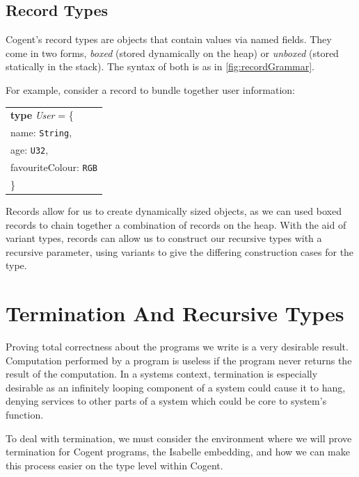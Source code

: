 \subsection{Record Types}

Cogent's record types are objects that contain values via named fields. They come in two forms, \textit{boxed}
(stored dynamically on the heap) or \textit{unboxed} (stored statically in the stack). The syntax of both is
as in \autoref{fig:recordGrammar}.

For example, consider a record to bundle together user information:

\begin{center}
    \begin{tabular}{l}
    \textbf{type} \textit{User} = \{ \\
                    \hspace{1.5em} name: \texttt{String},\\
                    \hspace{1.5em} age: \texttt{U32}, \\
                    \hspace{1.5em} favouriteColour: \texttt{RGB}\\
                    \} \\
    \end{tabular}
\end{center}

Records allow for us to create dynamically sized objects, as we can used boxed records to chain together a
combination of records on the heap. With the aid of variant types, records can allow us to construct 
our recursive types with a recursive parameter, using variants to give the 
differing construction cases for the type.

\section{Termination And Recursive Types}

Proving total correctness about the programs we write is a very desirable result.
Computation performed by a program is useless if the program never returns the
result of the computation.
In a systems context, termination is especially desirable as an infinitely looping component of a
system could cause it to hang, denying services to other parts of a system which could be core to
system's function.

To deal with termination, we must consider the environment where we will prove termination for
Cogent programs, the Isabelle embedding, and how we can make this process easier on the type
level within Cogent.

